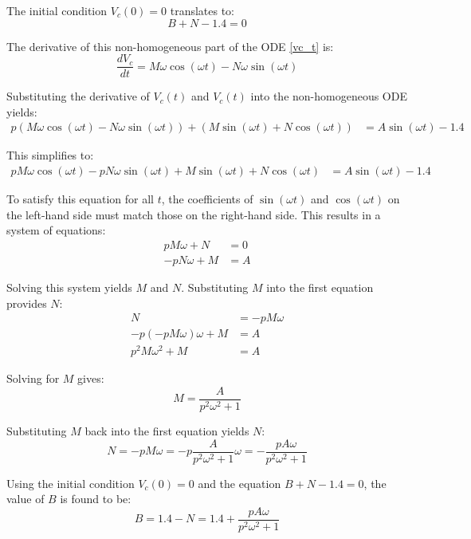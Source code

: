 The initial condition $V_c(0) = 0$ translates to:
\begin{equation}
B + N - 1.4 = 0
\end{equation}

The derivative of this non-homogeneous part of the ODE \eqref{vc_t} is:
\begin{equation}
\frac{dV_c}{dt} = M\omega\cos(\omega t) - N\omega\sin(\omega t)
\end{equation}

Substituting the derivative of $V_c(t)$ and $V_c(t)$ into the non-homogeneous ODE yields:
\begin{align}
p(M\omega\cos(\omega t) - N\omega\sin(\omega t)) + (M\sin(\omega t) + N\cos(\omega t)) &= A\sin(\omega t) - 1.4
\end{align}

This simplifies to:
\begin{align}
pM\omega\cos(\omega t) - pN\omega\sin(\omega t) + M\sin(\omega t) + N\cos(\omega t) &= A\sin(\omega t) - 1.4
\end{align}

To satisfy this equation for all $t$, the coefficients of $\sin(\omega t)$ and $\cos(\omega t)$ on the left-hand side must match those on the right-hand side. This results in a system of equations:
\begin{align}
pM\omega + N &= 0\\
-pN\omega + M &= A
\end{align}

Solving this system yields $M$ and $N$. Substituting $M$ into the first equation provides $N$:
\begin{align}
N &= -pM\omega\\
-p(-pM\omega)\omega + M &= A\\
p^2M\omega^2 + M &= A
\end{align}

Solving for $M$ gives:
\begin{equation}
M = \frac{A}{p^2\omega^2 + 1}
\end{equation}

Substituting $M$ back into the first equation yields $N$:
\begin{equation}
N = -pM\omega = -p\frac{A}{p^2\omega^2 + 1}\omega = -\frac{pA\omega}{p^2\omega^2 + 1}
\end{equation}

Using the initial condition $V_c(0) = 0$ and the equation $B + N - 1.4 = 0$, the value of $B$ is found to be:
\begin{equation}
B = 1.4 - N = 1.4 + \frac{pA\omega}{p^2\omega^2 + 1}
\end{equation}

